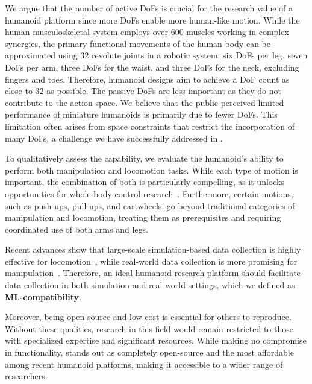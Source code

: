 We argue that the number of active DoFs is crucial for the research value of a humanoid platform since more DoFs enable more human-like motion. While the human musculoskeletal system employs over 600 muscles working in complex synergies, the primary functional movements of the human body can be approximated using 32 revolute joints in a robotic system: six DoFs per leg, seven DoFs per arm, three DoFs for the waist, and three DoFs for the neck, excluding fingers and toes. Therefore, humanoid designs aim to achieve a DoF count as close to 32 as possible. The passive DoFs are less important as they do not contribute to the action space. We believe that the public perceived limited performance of miniature humanoids is primarily due to fewer DoFs. This limitation often arises from space constraints that restrict the incorporation of many DoFs, a challenge we have successfully addressed in \system. 

To qualitatively assess the capability, we evaluate the humanoid’s ability to perform both manipulation and locomotion tasks. While each type of motion is important, the combination of both is particularly compelling, as it unlocks opportunities for whole-body control research~\citep{he2024omnih2oa, he2024hover, fu2024humanplus, ji2024exbody2, lu2024mobiletelevision}. Furthermore, certain motions, such as push-ups, pull-ups, and cartwheels, go beyond traditional categories of manipulation and locomotion, treating them as prerequisites and requiring coordinated use of both arms and legs.

Recent advances show that large-scale simulation-based data collection is highly effective for locomotion~\citep{rudin2022learning, tan2018simtoreal, lee2020learning}, while real-world data collection is more promising for manipulation~\citep{oneill2024open, khazatsky2024droid, mandlekar2019scaling}. Therefore, an ideal humanoid research platform should facilitate data collection in both simulation and real-world settings, which we defined as \textbf{ML-compatibility}.

Moreover, being open-source and low-cost is essential for others to reproduce. Without these qualities, research in this field would remain restricted to those with specialized expertise and significant resources. While making no compromise in functionality, \system stands out as completely open-source and the most affordable among recent humanoid platforms, making it accessible to a wider range of researchers.


